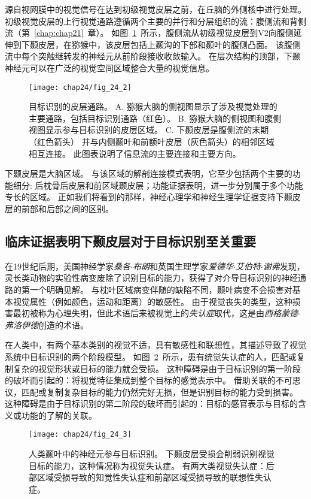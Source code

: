 源自视网膜中的视觉信号在达到初级视觉皮层之前，在丘脑的外侧核中进行处理。
初级视觉皮层的上行视觉通路遵循两个主要的并行和分层组织的流：腹侧流和背侧流（第~\ref{chap:chap21}~章）。
如图~\ref{fig:24_2}~所示，腹侧流从初级视觉皮层到V2向腹侧延伸到下颞皮层，在猕猴中，该皮层包括上颞沟的下部和颞叶的腹侧凸面。
该腹侧流中每个突触继转发的神经元从前阶段接收收敛输入。
在层次结构的顶部，下颞神经元可以在广泛的视觉空间区域整合大量的视觉信息。


\begin{figure}[htbp]
	\centering
	\texttt{[image: chap24/fig\_24\_2]}
	\caption{目标识别的皮层通路。
		A. 猕猴大脑的侧视图显示了涉及视觉处理的主要通路，包括目标识别通路（红色）。
		B. 猕猴大脑的侧视图和腹侧视图显示参与目标识别的皮层区域。
		C. 下颞皮层是腹侧流的末期（红色箭头） 并与内侧颞叶和前额叶皮层（灰色箭头）的相邻区域相互连接。
		此图表说明了信息流的主要连接和主要方向。}
	\label{fig:24_2}
\end{figure}


下颞皮层是大脑区域。
与该区域的解剖连接模式表明，它至少包括两个主要的功能细分: 后枕骨后皮层和前区域颞皮层；功能证据表明，进一步分别属于多个功能专长的区域。
正如我们将看到的那样，神经心理学和神经生理学证据支持下颞皮层的前部和后部之间的区别。



\subsection{临床证据表明下颞皮层对于目标识别至关重要}

在19世纪后期，美国神经学家\textit{桑各$\cdot$布朗}和英国生理学家\textit{爱德华$\cdot$艾伯特$\cdot$谢弗}发现，灵长类动物的实验性病变废除了识别目标的能力，获得了对介导目标识别的神经通路的第一个明确见解。
与枕叶区域病变伴随的缺陷不同，颞叶病变不会损害对基本视觉属性（例如颜色，运动和距离）的敏感性。
由于视觉丧失的类型，这种损害最初被称为心理失明，但此术语后来被视觉上的\textit{失认症}取代，这是由\textit{西格蒙德$\cdot$弗洛伊德}创造的术语。


在人类中，有两个基本类别的视觉不适，具有敏感性和联想性，其描述导致了视觉系统中目标识别的两个阶段模型。
如图~\ref{fig:24_3}~所示，患有统觉失认症的人，匹配或复制复杂的视觉形状或目标的能力就会受损。
这种障碍是由于目标识别的第一阶段的破坏而引起的：将视觉特征集成到整个目标的感觉表示中。
借助关联的不可思议，匹配或复制复杂目标的能力仍然完好无损，但是识别目标的能力受到损害。
这种障碍是由于目标识别的第二阶段的破坏而引起的：目标的感官表示与目标的含义或功能的了解的关联。


\begin{figure}[htbp]
	\centering
	\texttt{[image: chap24/fig\_24\_3]}
	\caption{人类颞叶中的神经元参与目标识别。
		下颞皮层受损会削弱识别视觉目标的能力，这种情况称为视觉失认症。
		有两大类视觉失认症：后部区域受损导致的知觉性失认症和前部区域受损导致的联想性失认症。}
	\label{fig:24_3}
\end{figure}


